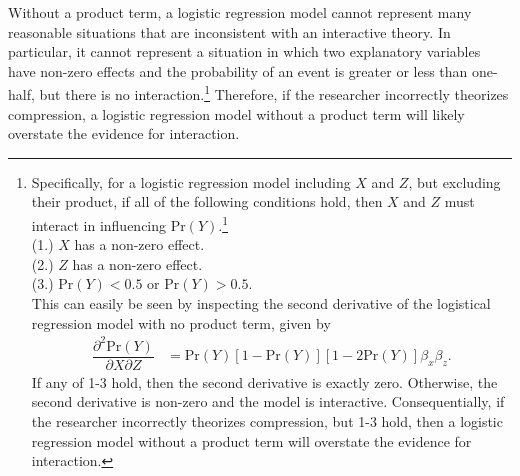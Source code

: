 \documentclass[12pt]{article}
\begin{document}
Without a product term, a logistic regression model cannot represent many reasonable situations that are inconsistent with an interactive theory. In particular, it cannot represent a situation in which two explanatory variables have non-zero effects and the probability of an event is greater or less than one-half, but there is no interaction.\footnote{Specifically, for a logistic regression model including $X$ and $Z$, but excluding their product, if all of the following conditions hold, then $X$ and $Z$ must interact in influencing Pr$(Y)$.\footnote{See the intuition of the claim by inspecting the second derivative of Pr($Y$), given by
\begin{center}
$\dfrac{\partial^2 \text{Pr}(Y)}{\partial X \partial Z} = \text{Pr}(Y)[1 - \text{Pr}(Y)][1 - 2\text{Pr}(Y)]\beta_x\beta_z$.
\end{center}
Notice that the second derivative can equal zero if and only if one of the conditions does not hold. For further discussion, see \cite{Nagler1991} and \cite{BerryDeMerittEsarey2010}.}\\
(1.) $X$ has a non-zero effect.\\
(2.) $Z$ has a non-zero effect.\\
(3.) $\text{Pr}(Y) < 0.5$ or $\text{Pr}(Y) > 0.5$.\\This can easily be seen by inspecting the second derivative of the logistical regression model with no product term, given by \begin{align}
\dfrac{\partial^2 \text{Pr}(Y)}{\partial X \partial Z} &=  \text{Pr}(Y)[1 - \text{Pr}(Y)][1 - 2\text{Pr}(Y)]\beta_x \beta_z. \nonumber
\end{align}
If any of 1-3 hold, then the second derivative is exactly zero. Otherwise, the second derivative is non-zero and the model is interactive. Consequentially, if the researcher incorrectly theorizes compression, but 1-3 hold, then a logistic regression model without a product term will overstate the evidence for interaction.\label{fn:conditions}} Therefore, if the researcher incorrectly theorizes compression, a logistic regression model without a product term will likely overstate the evidence for interaction.
\end{document}
